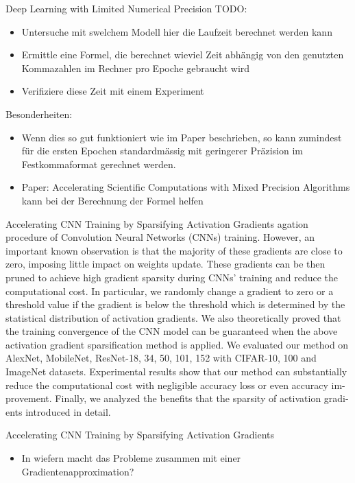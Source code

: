 \documentclass[10pt]{beamer}
\begin{document}
\begin{frame}{Deep Learning with Limited Numerical Precision}
 TODO:
 \begin{itemize}
  \item Untersuche mit swelchem Modell hier die Laufzeit berechnet werden kann 
  \item Ermittle eine Formel, die berechnet wieviel Zeit abhängig von den genutzten Kommazahlen im Rechner pro Epoche gebraucht wird
  \item Verifiziere diese Zeit mit einem Experiment
 \end{itemize}
 Besonderheiten:
 \begin{itemize}
  \item Wenn dies so gut funktioniert wie im Paper beschrieben, so kann zumindest für die ersten Epochen standardmässig mit geringerer Präzision im Festkommaformat gerechnet werden.
  \item Paper: Accelerating Scientific Computations with Mixed
Precision Algorithms kann bei der Berechnung der Formel helfen
 \end{itemize}
\end{frame}

\begin{frame}{Accelerating CNN Training by Sparsifying Activation
Gradients}
 agation procedure of Convolution Neural Networks (CNNs) training. However,
an important known observation is that the majority of these gradients are close
to zero, imposing little impact on weights update. These gradients can be then
pruned to achieve high gradient sparsity during CNNs’ training and reduce the
computational cost. In particular, we randomly change a gradient to zero or a
threshold value if the gradient is below the threshold which is determined by the
statistical distribution of activation gradients. We also theoretically proved that
the training convergence of the CNN model can be guaranteed when the above
activation gradient sparsification method is applied. We evaluated our method on
AlexNet, MobileNet, ResNet-{18, 34, 50, 101, 152} with CIFAR-{10, 100} and
ImageNet datasets. Experimental results show that our method can substantially
reduce the computational cost with negligible accuracy loss or even accuracy im-
provement. Finally, we analyzed the benefits that the sparsity of activation gradi-
ents introduced in detail.
\end{frame}

\begin{frame}{Accelerating CNN Training by Sparsifying Activation
Gradients}
\begin{itemize}
 \item In wiefern macht das Probleme zusammen mit einer Gradientenapproximation?
\end{itemize}

\end{frame}
\end{document}
